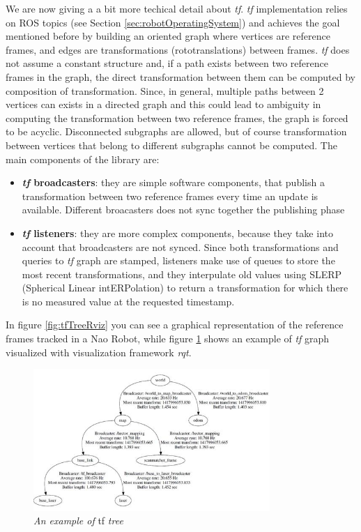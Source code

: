 We are now giving a a bit more techical detail about \textit{tf}.
\textit{tf} implementation relies on \ac{ROS} topics (see Section \ref{sec:robotOperatingSystem}) and achieves the goal mentioned before by building an oriented graph where vertices are reference frames, and edges are transformations (rototranslations) between frames. \textit{tf} does not assume a constant structure and, if a path exists between two reference frames in the graph, the direct transformation between them can be computed by composition of transformation. Since, in general, multiple paths between 2 vertices can exists in a directed graph and this could lead to ambiguity in computing the transformation between two reference frames, the graph is forced to be acyclic. Disconnected subgraphs are allowed, but of course transformation between vertices that belong to different subgraphs cannot be computed. 
The main components of the library are:
\begin{itemize}
	\item \textbf{\textit{tf} broadcasters}: they are simple software components, that publish a transformation between two reference frames every time an update is available. Different broacasters does not sync together the publishing phase
	\item \textbf{\textit{tf} listeners}: they are more complex components, because they take into account that broadcasters are not synced. Since both transformations and queries to \textit{tf} graph are stamped, listeners make use of queues to store the most recent transformations, and they  interpulate old values using SLERP (Spherical Linear intERPolation) to return a transformation for which there is no measured value at the requested timestamp.
\end{itemize}
In figure \ref{fig:tfTreeRviz} you can see a graphical representation of the reference frames tracked in a Nao Robot, while figure \ref{fig:tfGraph} shows an example of \textit{tf} graph visualized with visualization framework \textit{rqt}. 

\begin{figure}
	\centering
	\includegraphics[width=0.8\textwidth]{Images/background_and_tools/tfGraph.JPG}
	\caption{\textit{An example of} tf \textit{tree}}
	\label{fig:tfGraph}
\end{figure}

